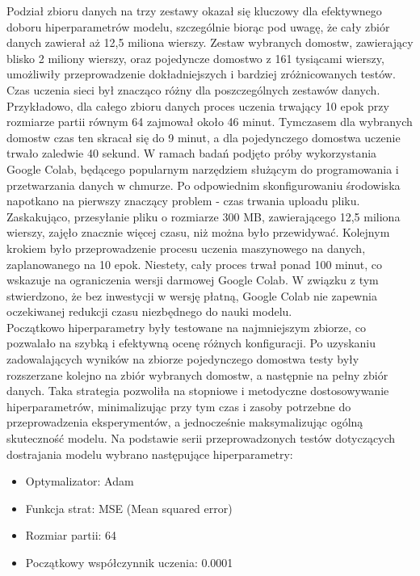 \documentclass[a4paper,twoside,12pt]{book}
\begin{document}
Podział zbioru danych na trzy zestawy okazał się kluczowy dla efektywnego doboru hiperparametrów modelu, szczególnie biorąc pod uwagę, że cały zbiór danych zawierał aż 12,5 miliona wierszy. Zestaw wybranych domostw, zawierający blisko 2 miliony wierszy, oraz pojedyncze domostwo z 161 tysiącami wierszy, umożliwiły przeprowadzenie dokładniejszych i bardziej zróżnicowanych testów. Czas uczenia sieci był znacząco różny dla poszczególnych zestawów danych. Przykładowo, dla całego zbioru danych proces uczenia trwający 10 epok przy rozmiarze partii równym 64 zajmował około 46 minut. Tymczasem dla wybranych domostw czas ten skracał się do 9 minut, a dla pojedynczego domostwa uczenie trwało zaledwie 40 sekund. W ramach badań podjęto próby wykorzystania Google Colab, będącego popularnym narzędziem służącym do programowania i przetwarzania danych w chmurze. Po odpowiednim skonfigurowaniu środowiska napotkano na pierwszy znaczący problem - czas trwania uploadu pliku. Zaskakująco, przesyłanie pliku o rozmiarze 300 MB, zawierającego 12,5 miliona wierszy, zajęło znacznie więcej czasu, niż można było przewidywać. Kolejnym krokiem było przeprowadzenie procesu uczenia maszynowego na danych, zaplanowanego na 10 epok. Niestety, cały proces trwał ponad 100 minut, co wskazuje na ograniczenia wersji darmowej Google Colab. W związku z tym stwierdzono, że bez inwestycji w wersję płatną, Google Colab nie zapewnia oczekiwanej redukcji czasu niezbędnego do nauki modelu.\\

Początkowo hiperparametry były testowane na najmniejszym zbiorze, co pozwalało na szybką i efektywną ocenę różnych konfiguracji. Po uzyskaniu zadowalających wyników na zbiorze pojedynczego domostwa testy były rozszerzane kolejno na zbiór wybranych domostw, a następnie na pełny zbiór danych. Taka strategia pozwoliła na stopniowe i metodyczne dostosowywanie hiperparametrów, minimalizując przy tym czas i zasoby potrzebne do przeprowadzenia eksperymentów, a jednocześnie maksymalizując ogólną skuteczność modelu. Na podstawie serii przeprowadzonych testów dotyczących dostrajania modelu wybrano następujące hiperparametry:
\newpage
\begin{itemize}
  \item Optymalizator: Adam
  \item Funkcja strat: MSE (Mean squared error)
  \item Rozmiar partii: 64
  \item Początkowy współczynnik uczenia: 0.0001
\end{itemize}
\end{document}
